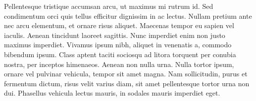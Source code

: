\documentclass[a4paper,10pt,twoside]{article} %
\begin{document}
Pellentesque tristique accumsan arcu, ut maximus mi rutrum id.
Sed condimentum orci quis tellus efficitur dignissim in ac lectus.
Nullam pretium ante nec arcu elementum, et ornare risus aliquet.
Maecenas tempor eu sapien vel iaculis.
Aenean tincidunt laoreet sagittis.
Nunc imperdiet enim non justo maximus imperdiet.
Vivamus ipsum nibh, aliquet in venenatis a, commodo bibendum ipsum.
Class aptent taciti sociosqu ad litora torquent per conubia nostra, per inceptos himenaeos.
Aenean non nulla urna.
Nulla tortor ipsum, ornare vel pulvinar vehicula, tempor sit amet magna.
Nam sollicitudin, purus et fermentum dictum, risus velit varius diam, sit amet pellentesque tortor urna non dui.
Phasellus vehicula lectus mauris, in sodales mauris imperdiet eget.
\end{document}
